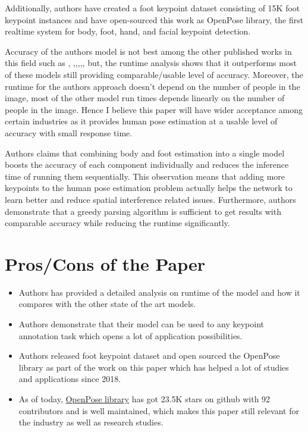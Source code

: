 \documentclass[twocolumn]{article}
\begin{document}
Additionally, authors have created a foot keypoint dataset consisting of 15K foot keypoint instances and have open-sourced this work as OpenPose library, the first realtime system for body, foot, hand, and facial keypoint detection.

Accuracy of the authors model is not best among the other published works in this field such as \cite{he2017mask}, \cite{fang2017rmpe},\cite{chen2018cascaded},\cite{xiao2018simple},\cite{newell2017associative},\cite{fieraru2018learning}, but, the runtime analysis shows that it outperforms most of these models still providing comparable/usable level of accuracy. Moreover, the runtime for the authors approach doesn't depend on the number of people in the image, most of the other model run times depends linearly on the number of people in the image. Hence I believe this paper will have wider acceptance among certain industries as it provides human pose estimation at a usable level of accuracy with small response time.

Authors claims that combining body and foot estimation into a single model boosts the accuracy of each
component individually and reduces the inference time of running them sequentially. This observation means that adding more keypoints to the human pose estimation problem actually helps the network to learn better and reduce spatial interference related issues. Furthermore, authors demonstrate that a greedy parsing algorithm is sufficient to get results with comparable accuracy while reducing the runtime significantly.


\section{Pros/Cons of the Paper}

\begin{itemize}
	\item Authors has provided a detailed analysis on runtime of the model and how it compares with the other state of the art models.
	\item Authors demonstrate that their model can be used to any keypoint annotation task which opens a lot of application possibilities.
	\item Authors released foot keypoint dataset  and open sourced the OpenPose library as part of the work on this paper which has helped a lot of studies and applications since 2018.
	\item As of today, \href{https://github.com/CMU-Perceptual-Computing-Lab/openpose}{OpenPose library} has got 23.5K stars on github with 92 contributors and is well maintained, which makes this paper still relevant for the industry as well as research studies.
\end{itemize}
\end{document}

